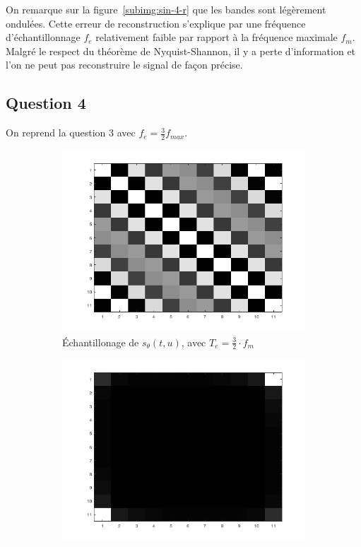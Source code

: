 \documentclass[a4paper]{article}
\newcommand{\figref}[1]{figure~\ref{#1}}
\begin{document}
On remarque sur la \figref{subimg:sin-4-r} que les bandes sont légèrement
ondulées. Cette erreur de reconstruction s'explique par une fréquence
d'échantillonnage $f_e$ relativement faible par rapport à la fréquence maximale
$f_m$. Malgré le respect du théorème de Nyquist-Shannon, il y a perte
d'information et l'on ne peut pas reconstruire le signal de façon précise.

\subsection*{Question 4}
On reprend la question 3 avec $f_e = \frac{3}{2} f_{max}$.

\begin{figure}[H]
    \centering
    \begin{subfigure}[c]{0.46\textwidth}
        \centering
        \includegraphics[width=\textwidth]{images/sin-e4.png}
        \caption{Échantillonage de $s_{\theta}(t,u)$, avec $T_e= \frac{3}{2}
        \cdot f_m$}
    \label{subimg:sin-3demi-e}
    \end{subfigure}
    \begin{subfigure}[c]{0.46\textwidth}
        \centering
        \includegraphics[width=\textwidth]{images/ft42D.png}

\end{subfigure}
\end{figure}
\end{document}
